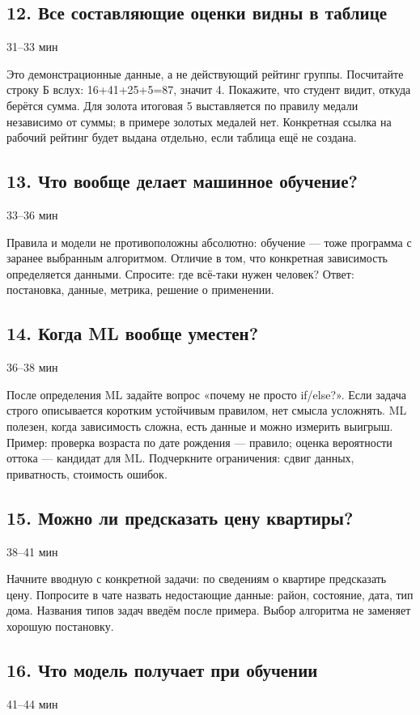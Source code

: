 \documentclass[11pt,a4paper]{article}
\newcommand{\timing}[1]{\hfill{\small\color{blue}#1}}
\begin{document}
\subsection{12. Все составляющие оценки видны в таблице}
\timing{31–33 мин}

Это демонстрационные данные, а не действующий рейтинг группы. Посчитайте строку Б вслух: 16+41+25+5=87, значит 4. Покажите, что студент видит, откуда берётся сумма. Для золота итоговая 5 выставляется по правилу медали независимо от суммы; в примере золотых медалей нет. Конкретная ссылка на рабочий рейтинг будет выдана отдельно, если таблица ещё не создана.

\subsection{13. Что вообще делает машинное обучение?}
\timing{33–36 мин}

Правила и модели не противоположны абсолютно: обучение — тоже программа с заранее выбранным алгоритмом. Отличие в том, что конкретная зависимость определяется данными. Спросите: где всё-таки нужен человек? Ответ: постановка, данные, метрика, решение о применении.

\subsection{14. Когда ML вообще уместен?}
\timing{36–38 мин}

После определения ML задайте вопрос «почему не просто if/else?». Если задача строго описывается коротким устойчивым правилом, нет смысла усложнять. ML полезен, когда зависимость сложна, есть данные и можно измерить выигрыш. Пример: проверка возраста по дате рождения — правило; оценка вероятности оттока — кандидат для ML. Подчеркните ограничения: сдвиг данных, приватность, стоимость ошибок.

\subsection{15. Можно ли предсказать цену квартиры?}
\timing{38–41 мин}

Начните вводную с конкретной задачи: по сведениям о квартире предсказать цену. Попросите в чате назвать недостающие данные: район, состояние, дата, тип дома. Названия типов задач введём после примера. Выбор алгоритма не заменяет хорошую постановку.

\subsection{16. Что модель получает при обучении}
\timing{41–44 мин}
\end{document}
